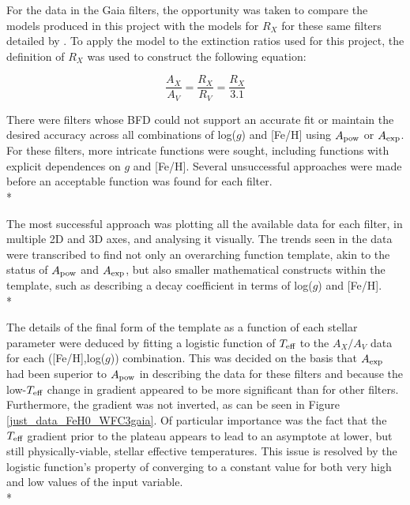 \documentclass[12pt, a4paper]{report}
\begin{document}
For the data in the Gaia filters, the opportunity was taken to compare the models produced in this project with the models for $R_{X}$ for these same filters detailed by \cite{2018MNRAS.479L.102C}. To apply the \cite{2018MNRAS.479L.102C} model to the extinction ratios used for this project, the definition of $R_{X}$ was used to construct the following equation:

\begin{equation}
\frac{A_{X}}{A_{V}} = \frac{R_{X}}{R_{V}} = \frac{R_{X}}{3.1}
\label{convert_Rx_to_Ax}
\end{equation}

There were filters whose BFD could not support an accurate fit or maintain the desired accuracy across all combinations of log($g$) and [Fe/H] using $A_{\textnormal{pow}}$ or $A_{\textnormal{exp}}$. For these filters, more intricate functions were sought, including functions with explicit dependences on $g$ and [Fe/H]. Several unsuccessful approaches were made before an acceptable function was found for each filter.\\*

The most successful approach was plotting all the available data for each filter, in multiple 2D and 3D axes, and analysing it visually. The trends seen in the data were transcribed to find not only an overarching function template, akin to the status of $A_{\textnormal{pow}}$ and $A_{\textnormal{exp}}$, but also smaller mathematical constructs within the template, such as describing a decay coefficient in terms of log($g$) and [Fe/H].\\*

The details of the final form of the template as a function of each stellar parameter were deduced by fitting a logistic function of $T_{\textnormal{eff}}$ to the $A_{X}/A_{V}$ data for each ([Fe/H],log($g$)) combination. This was decided on the basis that $A_{\textnormal{exp}}$ had been superior to $A_{\textnormal{pow}}$ in describing the data for these filters and because the low-$T_{\textnormal{eff}}$ change in gradient appeared to be more significant than for other filters. Furthermore, the gradient was not inverted, as can be seen in Figure \ref{just_data_FeH0_WFC3gaia}. Of particular importance was the fact that the $T_{\textnormal{eff}}$ gradient prior to the plateau appears to lead to an asymptote at lower, but still physically-viable, stellar effective temperatures. This issue is resolved by the logistic function's property of converging to a constant value for both very high and low values of the input variable. \\*
\end{document}

